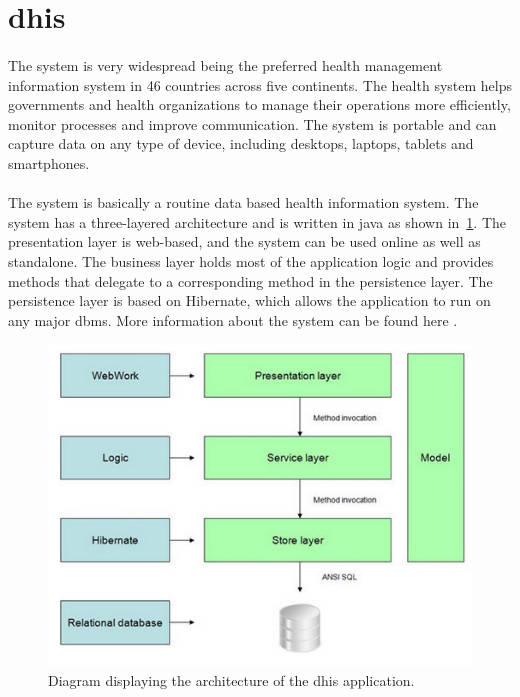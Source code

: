 \documentclass[11pt,english,a4paper]{report}
\begin{document}
\section{\gls{dhis}}
\paragraph{}
The system is very widespread being the preferred health management information system in 46 countries across five continents. 
The health system helps governments and health organizations to manage their operations more efficiently, monitor processes and improve communication. 
The system is portable and can capture data on any type of device, including desktops, laptops, tablets and smartphones. 

\paragraph{}
The system is basically a routine data based health information system. 
The system has a three-layered architecture and is written in \gls{java} as shown in~\ref{fig:dhisarch}.
The presentation layer is web-based, and the system can be used online as well as standalone.
The business layer holds most of the application logic and provides methods that delegate to a corresponding method in the persistence layer.
The persistence layer is based on Hibernate, which allows the application to run on any major \gls{dbms}.
More information about the system can be found here \cite{dhis2-homepage, dhis2-wiki}.

\begin{figure}[h]
    \centering
    \includegraphics[scale=0.65]{images/dhis2-architecture.png}
    \caption{Diagram displaying the architecture of the \gls{dhis} application. }
    \label{fig:dhisarch}
\end{figure}
\end{document}
